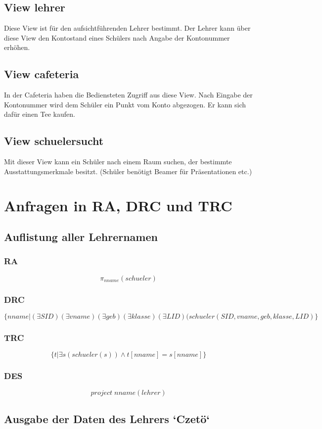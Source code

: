 \documentclass[fleqn]{scrartcl}
\begin{document}
\subsection{View lehrer}
Diese View ist für den aufsichtführenden Lehrer bestimmt. Der Lehrer kann über diese View den Kontostand eines Schülers nach 
Angabe der Kontonummer erhöhen.
\subsection{View cafeteria}
In der Cafeteria haben die Bediensteten Zugriff aus diese View. Nach Eingabe der Kontonummer wird dem Schüler ein Punkt vom Konto abgezogen.
Er kann sich dafür einen Tee kaufen. 
\subsection{View schuelersucht}
Mit dieser View kann ein Schüler nach einem Raum suchen, der bestimmte Ausstattungsmerkmale besitzt. 
(Schüler benötigt Beamer für Präsentationen etc.)

\section{Anfragen in RA, DRC und TRC}
  
\subsection{Auflistung aller Lehrernamen}
\subsubsection{RA}
\[ \pi_{nname}(schueler) \]
\subsubsection{DRC}
\[ \{nname | (\exists SID) (\exists vname) (\exists geb) (\exists klasse) (\exists LID)(schueler(SID,vname,geb,klasse,LID)\} \]
\subsubsection{TRC}
\[ \{t|\exists s (schueler(s)) \wedge t[nname] = s[nname]\} \]
\subsubsection{DES}
\[ project\; nname (lehrer) \]

\subsection{Ausgabe der Daten des Lehrers `Czetö`}
\end{document}
